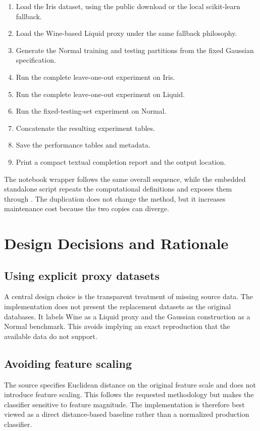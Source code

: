 \documentclass[11pt,a4paper]{article}
\newcommand{\code}[1]{\texttt{\detokenize{#1}}}
\begin{document}
\begin{enumerate}[leftmargin=*]
\item Load the Iris dataset, using the public download or the local scikit-learn fallback.
\item Load the Wine-based Liquid proxy under the same fallback philosophy.
\item Generate the Normal training and testing partitions from the fixed Gaussian specification.
\item Run the complete leave-one-out experiment on Iris.
\item Run the complete leave-one-out experiment on Liquid.
\item Run the fixed-testing-set experiment on Normal.
\item Concatenate the resulting experiment tables.
\item Save the performance tables and metadata.
\item Print a compact textual completion report and the output location.
\end{enumerate}

The notebook wrapper follows the same overall sequence, while the embedded standalone script repeats the computational definitions and exposes them through \code{main()}. The duplication does not change the method, but it increases maintenance cost because the two copies can diverge.

\section{Design Decisions and Rationale}

\subsection{Using explicit proxy datasets}

A central design choice is the transparent treatment of missing source data. The implementation does not present the replacement datasets as the original databases. It labels Wine as a Liquid proxy and the Gaussian construction as a Normal benchmark. This avoids implying an exact reproduction that the available data do not support.

\subsection{Avoiding feature scaling}

The source specifies Euclidean distance on the original feature scale and does not introduce feature scaling. This follows the requested methodology but makes the classifier sensitive to feature magnitude. The implementation is therefore best viewed as a direct distance-based baseline rather than a normalized production classifier.
\end{document}
